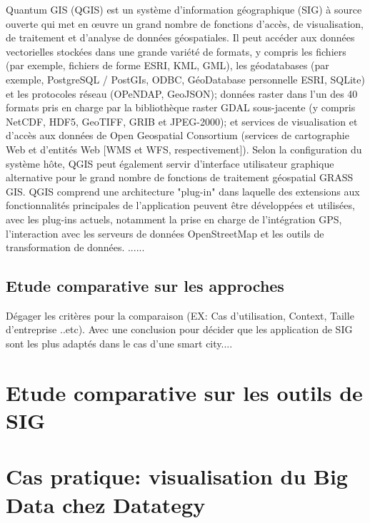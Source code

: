 \documentclass[french, a4paper, 12pt]{report}
\begin{document}
Quantum GIS (QGIS) est un système d’information géographique (SIG) à source ouverte qui met en œuvre un grand nombre de fonctions d’accès, de visualisation, de traitement et d’analyse de données géospatiales. Il peut accéder aux données vectorielles stockées dans une grande variété de formats, y compris les fichiers (par exemple, fichiers de forme ESRI, KML, GML), les géodatabases (par exemple, PostgreSQL / PostGIs, ODBC, GéoDatabase personnelle ESRI, SQLite) et les protocoles réseau (OPeNDAP, GeoJSON); données raster dans l'un des 40 formats pris en charge par la bibliothèque raster GDAL sous-jacente (y compris NetCDF, HDF5, GeoTIFF, GRIB et JPEG-2000); et services de visualisation et d'accès aux données de Open Geospatial Consortium (services de cartographie Web et d'entités Web [WMS et WFS, respectivement]). Selon la configuration du système hôte, QGIS peut également servir d’interface utilisateur graphique alternative pour le grand nombre de fonctions de traitement géospatial GRASS GIS. QGIS comprend une architecture "plug-in" dans laquelle des extensions aux fonctionnalités principales de l'application peuvent être développées et utilisées, avec les plug-ins actuels, notamment la prise en charge de l'intégration GPS, l'interaction avec les serveurs de données OpenStreetMap et les outils de transformation de données.
......

\section{Etude comparative sur les approches }

Dégager les critères pour la comparaison (EX: Cas d’utilisation, Context, Taille d’entreprise ..etc). Avec une conclusion pour décider que les application de SIG sont les plus adaptés dans le cas d’une smart city....














\chapter{ Etude comparative sur les outils de SIG }

\chapter{Cas pratique: visualisation du Big Data chez Datategy}
\end{document}
